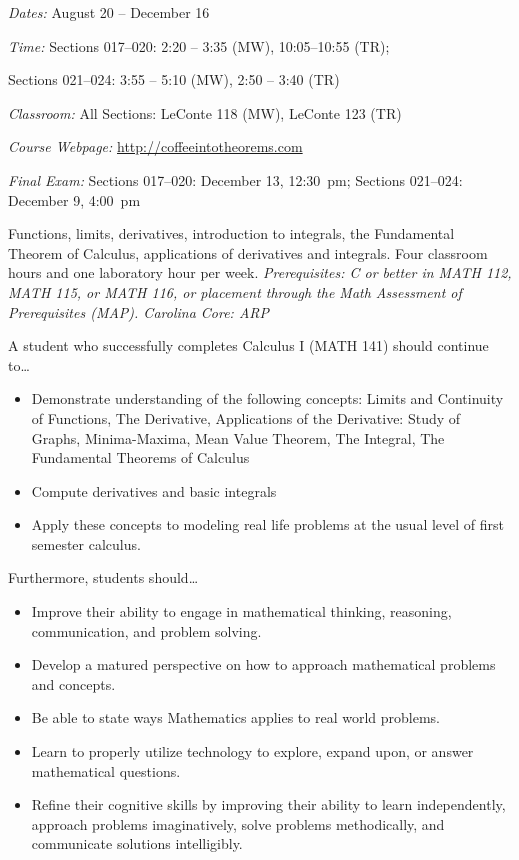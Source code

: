 \documentclass[11pt,letterpaper]{article}
\newcommand{\classdates}{August 20 -- December 16}
\newcommand{\classtimes}{Sections 017--020: 2:20 -- 3:35 (MW), 10:05--10:55 (TR); \par \hspace{0.94cm} Sections 021--024: 3:55 -- 5:10 (MW), 2:50 -- 3:40 (TR)}
\newcommand{\classroom}{All Sections: LeConte 118 (MW), LeConte 123 (TR)}
\newcommand{\website}{http://coffeeintotheorems.com}
\begin{document}
\textit{Dates:} \classdates \par
\textit{Time:} \classtimes \par
\textit{Classroom:} \classroom \par
\textit{Course Webpage:} \href{\website}{\website} \par
\textit{Final Exam:} Sections 017--020: December 13, 12:30~pm; Sections 021--024: December 9, 4:00~pm
\sectionbreak




Functions, limits, derivatives, introduction to integrals, the Fundamental Theorem of Calculus, applications of derivatives and integrals. Four classroom hours and one laboratory hour per week. {\itshape Prerequisites: C or better in MATH 112, MATH 115, or MATH 116, or placement through the Math Assessment of Prerequisites (MAP). Carolina Core: ARP}
\sectionbreak




A student who successfully completes Calculus I (MATH 141) should continue to\dots
	\begin{itemize} \itemsep=0.3ex
	\item Demonstrate understanding of the following concepts: Limits and Continuity of Functions, The Derivative, Applications of the Derivative: Study of Graphs, Minima-Maxima, Mean Value Theorem, The Integral, The Fundamental Theorems of Calculus
	\item Compute derivatives and basic integrals
	\item Apply these concepts to modeling real life problems at the usual level of first
semester calculus.
	\end{itemize}
Furthermore, students should\dots
	\begin{itemize} \itemsep=0.3ex
	\item  Improve their ability to engage in mathematical thinking, reasoning, communication, and problem solving.
	\item Develop a matured perspective on how to approach mathematical problems and concepts.
	\item Be able to state ways Mathematics applies to real world problems.
	\item Learn to properly utilize technology to explore, expand upon, or answer mathematical questions.
	\item Refine their cognitive skills by improving their ability to learn independently, approach problems imaginatively, solve problems methodically, and communicate solutions intelligibly.
	\end{itemize}
\sectionbreak
\end{document}
